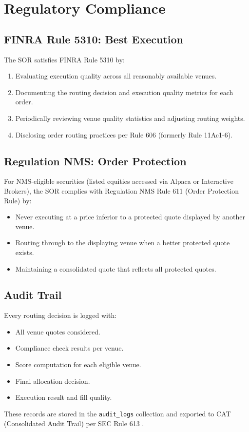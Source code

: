 \section{Regulatory Compliance}
\label{sec:regulatory}

\subsection{FINRA Rule 5310: Best Execution}

The SOR satisfies FINRA Rule 5310 by:

\begin{enumerate}[nosep]
  \item Evaluating execution quality across all reasonably available venues.
  \item Documenting the routing decision and execution quality metrics for each order.
  \item Periodically reviewing venue quality statistics and adjusting routing weights.
  \item Disclosing order routing practices per Rule 606 (formerly Rule 11Ac1-6).
\end{enumerate}

\subsection{Regulation NMS: Order Protection}

For NMS-eligible securities (listed equities accessed via Alpaca or Interactive Brokers), the SOR complies with Regulation NMS Rule 611 (Order Protection Rule) by:

\begin{itemize}[nosep]
  \item Never executing at a price inferior to a protected quote displayed by another venue.
  \item Routing through to the displaying venue when a better protected quote exists.
  \item Maintaining a consolidated quote that reflects all protected quotes.
\end{itemize}

\subsection{Audit Trail}

Every routing decision is logged with:

\begin{itemize}[nosep]
  \item All venue quotes considered.
  \item Compliance check results per venue.
  \item Score computation for each eligible venue.
  \item Final allocation decision.
  \item Execution result and fill quality.
\end{itemize}

These records are stored in the \texttt{audit\_logs} collection and exported to CAT (Consolidated Audit Trail) per SEC Rule 613 \cite{lux-ats-architecture}.

